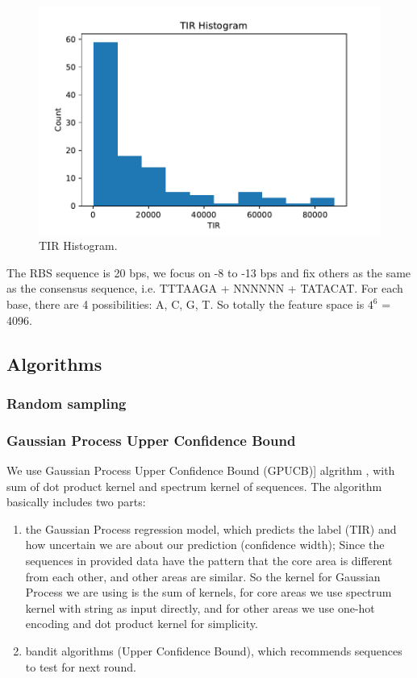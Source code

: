 \documentclass{article}
\begin{document}
\begin{figure}[t]
    \centering
    \includegraphics[scale=0.7]{plots/TIR_histogram.pdf}
    \caption{TIR Histogram.}
    \label{fig: TIR Histogram.}
\end{figure}

The RBS sequence is 20 bps, we focus on -8 to -13 bps and fix others as the same as the consensus sequence, i.e. TTTAAGA + NNNNNN + TATACAT. For each base, there are 4 possibilities: A, C, G, T. So totally the feature space is $4^6$ = 4096.

\subsection{Algorithms}

\subsubsection{Random sampling}

\subsubsection{Gaussian Process Upper Confidence Bound}

We use Gaussian Process Upper Confidence Bound (GPUCB)] algrithm \cite{srinivas2012information}, with sum of dot product kernel and spectrum kernel of sequences. The algorithm basically includes two parts:

\begin{enumerate}
    \item the Gaussian Process regression model, which predicts the label (TIR) and how uncertain we are about our prediction (confidence width); Since the sequences in provided data have the pattern that the core area is different from each other, and other areas are similar. So the kernel for Gaussian Process we are using is the sum of kernels, for core areas we use spectrum kernel with string as input directly, and for other areas we use one-hot encoding and dot product kernel for simplicity. 
    \item bandit algorithms (Upper Confidence Bound), which recommends sequences to test for next round.
\end{enumerate}
\end{document}
